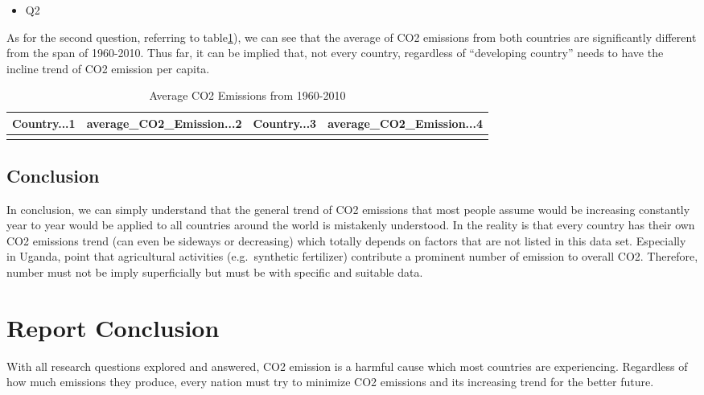 \documentclass[11pt,a4paper,]{article}
\providecommand{\tightlist}{%
  \setlength{\itemsep}{0pt}\setlength{\parskip}{0pt}}
\begin{document}
\begin{itemize}
\tightlist
\item
  Q2
\end{itemize}

As for the second question, referring to table\ref{tab:table1}), we can see that the average of CO2 emissions from both countries are significantly different from the span of 1960-2010. Thus far, it can be implied that, not every country, regardless of ``developing country'' needs to have the incline trend of CO2 emission per capita.

\begin{table}[!h]

\caption{\label{tab:table1}Average CO2 Emissions from 1960-2010}
\centering
\begin{tabular}[t]{lrlr}
\toprule
Country...1 & average\_CO2\_Emission...2 & Country...3 & average\_CO2\_Emission...4\\
\midrule
\cellcolor{gray!6}{Thailand} & \cellcolor{gray!6}{1.616342} & \cellcolor{gray!6}{Uganda} & \cellcolor{gray!6}{0.072436}\\
\bottomrule
\end{tabular}
\end{table}

\hypertarget{conclusion-2}{%
\subsection{Conclusion}\label{conclusion-2}}

In conclusion, we can simply understand that the general trend of CO2 emissions that most people assume would be increasing constantly year to year would be applied to all countries around the world is mistakenly understood. In the reality is that every country has their own CO2 emissions trend (can even be sideways or decreasing) which totally depends on factors that are not listed in this data set. Especially in Uganda, \textcite{waaswa2020development} point that agricultural activities (e.g.~synthetic fertilizer) contribute a prominent number of emission to overall CO2. Therefore, number must not be imply superficially but must be with specific and suitable data.

\hypertarget{report-conclusion}{%
\section{Report Conclusion}\label{report-conclusion}}

With all research questions explored and answered, CO2 emission is a harmful cause which most countries are experiencing. Regardless of how much emissions they produce, every nation must try to minimize CO2 emissions and its increasing trend for the better future.

\printbibliography
\end{document}
